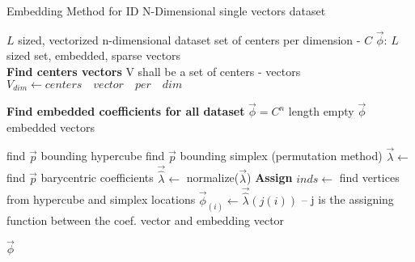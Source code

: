 \begin{algorithm}
				\caption{Embedding Method for ID N-Dimensional single vectors dataset}
				\begin{algorithmic}
				 
				
				\REQUIRE $L$ sized, vectorized n-dimensional dataset
				\REQUIRE set of centers per dimension - $C$
				\ENSURE $\overrightarrow{\phi}$: $L$ sized set, embedded, sparse vectors\\
				
				\STATE \textbf{Find centers vectors}
				\STATE V shall be a set of centers - vectors
				\STATE $V_{dim} \leftarrow centers \quad vector \quad per \quad dim$
				\ENDFOR
				
				\STATE \textbf{Find embedded coefficients for all dataset}
				\STATE $\overrightarrow{\phi} = C^{n}$ length empty $\overrightarrow{\phi}$ embedded vectors
				
				\STATE find $\overrightarrow{p}$ bounding hypercube 
				\STATE find $\overrightarrow{p}$ bounding simplex (permutation method)
				\STATE $\overrightarrow{\lambda} \leftarrow$ find $\overrightarrow{p}$ barycentric coefficients 
				\STATE $\overrightarrow{\hat{\lambda}} \leftarrow$ normalize($\overrightarrow{\lambda}$)
				\ENDFOR
				\STATE \textbf{Assign}
				\STATE $inds \leftarrow$ find vertices from hypercube and simplex locations
				\STATE $\overrightarrow{\phi}_{(i)} \leftarrow \overrightarrow{\hat{\lambda}}(j(i))$ -- j is the assigning function between the coef. vector and embedding vector
				\ENDFOR
				\ENDFOR
				
				\RETURN $\overrightarrow{\phi}$
	
				
				\end{algorithmic}
			\end{algorithm}